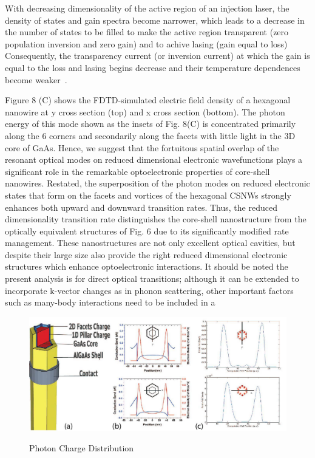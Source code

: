 With decreasing dimensionality of the active region of an injection laser, the
density of states and gain spectra become narrower, which leads to a decrease
in the number of states to be filled to make the active region transparent
(zero population inversion and zero gain) and to achive lasing (gain equal to
loss) Consequently, the transparency current (or inversion current) at which
the gain is equal to the loss and lasing begins decrease and their temperature
dependences become weaker~\cite{asryan2004theory}.

Figure 8 (C) shows the FDTD-simulated electric field density of a hexagonal
nanowire at y cross section (top) and x cross section (bottom). The photon
energy of this mode shown as the insets of Fig. 8(C) is concentrated primarily
along the 6 corners and secondarily along the facets with little light in the
3D core of GaAs. Hence, we suggest that the fortuitous spatial overlap of the
resonant optical modes on reduced dimensional electronic wavefunctions plays a
significant role in the remarkable optoelectronic properties of core-shell
nanowires. Restated, the superposition of the photon modes  on reduced
electronic states that form on the facets and vortices of the hexagonal CSNWs
strongly enhances both upward and downward transition rates.  Thus, the reduced
dimensionality transition rate distinguishes the core-shell nanostructure from
the optically equivalent structures of Fig. 6 due to its significantly modified
rate management. These nanostructures are not only excellent optical cavities,
but despite their large size also provide the right reduced dimensional
electronic structures which enhance optoelectronic interactions.  It should be
noted the present analysis is for direct optical transitions; although it can
be extended to incorporate k-vector changes as in phonon scattering, other
important factors such as many-body interactions need to be included in a


\begin{figure}
  \caption{Photon Charge Distribution}
  \centering
  \includegraphics[width=\textwidth]{pictures/ED/Photoncharge}
  \label{PhotonCharge}
\end{figure}


